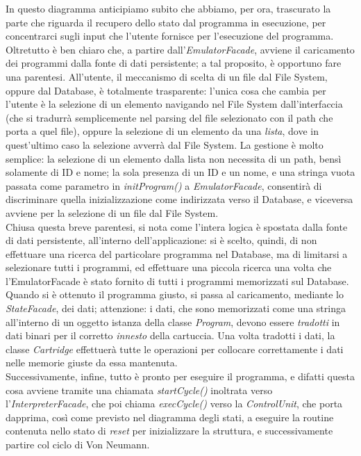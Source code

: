 \documentclass[11pt]{article}
\begin{document}
In questo diagramma anticipiamo subito che abbiamo, per ora, trascurato la parte che riguarda il recupero dello stato dal programma in esecuzione, per concentrarci sugli input che l'utente fornisce per l'esecuzione del programma. Oltretutto è ben chiaro che, a partire dall'\emph{EmulatorFacade}, avviene il caricamento dei programmi dalla fonte di dati persistente; a tal proposito, è opportuno fare una parentesi. All'utente, il meccanismo di scelta di un file dal File System, oppure dal Database, è totalmente trasparente: l'unica cosa che cambia per l'utente è la selezione di un elemento navigando nel File System dall'interfaccia (che si tradurrà semplicemente nel parsing del file selezionato con il path che porta a quel file), oppure la selezione di un elemento da una \emph{lista}, dove in quest'ultimo caso la selezione avverrà dal File System. La gestione è molto semplice: la selezione di un elemento dalla lista non necessita di un path, bensì solamente di ID e nome; la sola presenza di un ID e un nome, e una stringa vuota passata come parametro in \emph{initProgram()} a \emph{EmulatorFacade}, consentirà di discriminare quella inizializzazione come indirizzata verso il Database, e viceversa avviene per la selezione di un file dal File System.\\
Chiusa questa breve parentesi, si nota come l'intera logica è spostata dalla fonte di dati persistente, all'interno dell'applicazione: si è scelto, quindi, di non effettuare una ricerca del particolare programma nel Database, ma di limitarsi a selezionare tutti i programmi, ed effettuare una piccola ricerca una volta che l'EmulatorFacade è stato fornito di tutti i programmi memorizzati sul Database.\\
Quando si è ottenuto il programma giusto, si passa al caricamento, mediante lo \emph{StateFacade}, dei dati; attenzione: i dati, che sono memorizzati come una stringa all'interno di un oggetto istanza della classe \emph{Program}, devono essere \emph{tradotti} in dati binari per il corretto \emph{innesto} della cartuccia. Una volta tradotti i dati, la classe \emph{Cartridge} effettuerà tutte le operazioni per collocare correttamente i dati nelle memorie giuste da essa mantenuta.\\
Successivamente, infine, tutto è pronto per eseguire il programma, e difatti questa cosa avviene tramite una chiamata \emph{startCycle()} inoltrata verso l'\emph{InterpreterFacade}, che poi chiama \emph{execCycle()} verso la \emph{ControlUnit}, che porta dapprima, così come previsto nel diagramma degli stati, a eseguire la routine contenuta nello stato di \emph{reset} per inizializzare la struttura, e successivamente partire col ciclo di Von Neumann.
\end{document}
